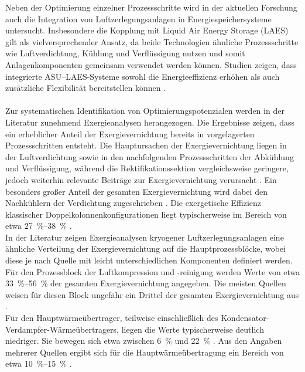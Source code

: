 Neben der Optimierung einzelner Prozessschritte wird in der aktuellen Forschung auch die Integration von Luftzerlegungsanlagen in Energiespeichersysteme untersucht. Insbesondere die Kopplung mit Liquid Air Energy Storage (LAES) gilt als vielversprechender Ansatz, da beide Technologien ähnliche Prozessschritte wie Luftverdichtung, Kühlung und Verflüssigung nutzen und somit Anlagenkomponenten gemeinsam verwendet werden können. Studien zeigen, dass integrierte ASU–LAES-Systeme sowohl die Energieeffizienz erhöhen als auch zusätzliche Flexibilität bereitstellen können
\cite{wangCoupledSystemLiquid2024, wangNovelASULAES2024, yuNovelMultigenerationLiquid2025}.\\
\\
Zur systematischen Identifikation von Optimierungspotenzialen werden in der Literatur zunehmend Exergieanalysen herangezogen. Die Ergebnisse zeigen, dass ein erheblicher Anteil der Exergievernichtung bereits in vorgelagerten Prozessschritten entsteht. Die Hauptursachen der Exergievernichtung liegen in der Luftverdichtung sowie in den nachfolgenden Prozessschritten der Abkühlung und Verflüssigung, während die Rektifikationssektion vergleichsweise geringere, jedoch weiterhin relevante Beiträge zur Exergievernichtung verursacht \cite{cornelissenExergyAnalysisCryogenic1998, bucsaExergeticAnalysisCryogenic2022a, hamayunEvaluationTwoColumnAir2020}. Ein besonders großer Anteil der gesamten Exergievernichtung wird dabei den Nachkühlern der Verdichtung zugeschrieben \cite{van_der_ham_exergy_2010}. Die exergetische Effizienz klassischer Doppelkolonnenkonfigurationen liegt typischerweise im Bereich von etwa \SIrange{27}{38}{\percent} \cite{teschComparativeEvaluationCryogenic2020, cornelissenExergyAnalysisCryogenic1998, bucsaExergeticAnalysisCryogenic2022a, vanderhamExergyAnalysisTwo2010}. \\
In der Literatur zeigen Exergieanalysen kryogener Luftzerlegungsanlagen eine ähnliche Verteilung der Exergievernichtung auf die Hauptprozessblöcke, wobei diese je nach Quelle mit leicht unterschiedlichen Komponenten definiert werden. Für den Prozessblock der Luftkompression und -reinigung werden Werte von etwa \SIrange{33}{56}{\percent} der gesamten Exergievernichtung angegeben. Die meisten Quellen weisen für diesen Block ungefähr ein Drittel der gesamten Exergievernichtung aus \cite{fuUsingExergyAnalysis2012, ebrahimiEnergeticExergeticEconomic2015, cornelissenExergyAnalysisCryogenic1998}.\\
Für den Hauptwärmeübertrager, teilweise einschließlich des Kondensator-Verdampfer-Wärmeübertragers, liegen die Werte typischerweise deutlich niedriger. Sie bewegen sich etwa zwischen \SI{6}{\percent} \cite{fuUsingExergyAnalysis2012} und \SI{22}{\percent} \cite{rizkRealColumnDesign2012}. Aus den Angaben mehrerer Quellen ergibt sich für die Hauptwärmeübertragung ein Bereich von etwa \SIrange{10}{15}{\percent} \cite{teschExergybasedMethodsApplied, vanderhamExergyAnalysisTwo2010, bucsaExergeticAnalysisCryogenic2022a}. \\
